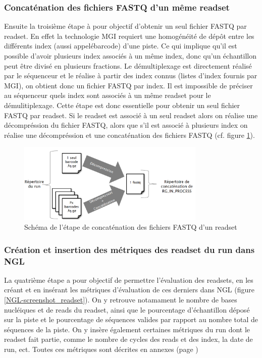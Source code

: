 \subsubsection*{Concaténation des fichiers FASTQ d'un même readset}
Ensuite la troisième étape à pour objectif d'obtenir un seul fichier FASTQ par readset.
En effet la technologie MGI requiert une homogénéité de dépôt entre les différents index (aussi appelé\og barcode\fg{}) d'une piste.
Ce qui implique qu'il est possible d'avoir plusieurs index associés à un même index, donc qu'un échantillon peut être divisé en plusieurs fractions.
Le démultiplexage est directement réalisé par le séquenceur et le réalise à partir des index connus (listes d'index fournis par MGI), on obtient donc un fichier FASTQ par index. Il est impossible de préciser au séquenceur quels index sont associés à un même readset pour le démulitiplexage.
Cette étape est donc essentielle pour obtenir un seul fichier FASTQ par readset.
Si le readset est associé à un seul readset alors on réalise une décompréssion du fichier FASTQ, alors que s'il est associé à plusieurs index on réalise une décompréssion et une concaténation des fichiers FASTQ (cf. figure \ref{schema-concat-fastq}).

\begin{figure}[H]
    \centering
    \includegraphics[width=0.8\textwidth]{img/Schéma_concaténation.png}
    \caption{\footnotesize{Schéma de l'étape de \og concaténation\fg{} des fichiers FASTQ d'un readset}}
    \label{schema-concat-fastq}
\end{figure}

\subsubsection*{Création et insertion des métriques des readset du run dans NGL}
La quatrième étape a pour objectif de permettre l'évaluation des readsets, en les créant et en insérant les métriques d'évaluation de ces derniers dans NGL (figure \ref{NGL-screenshot_readset}).
On y retrouve notamament le nombre de bases nucléiques et de reads du readset, ainsi que le pourcentage d'échantillon déposé sur la piste et le pourcentage de séquences valides par rapport au nombre total de séquences de la piste.
On y insère également certaines métriques du run dont le readset fait partie, comme le nombre de cycles des reads et des index, la date de run, ect. Toutes ces métriques sont décrites en annexes (page \pageref{anexes3})\\

